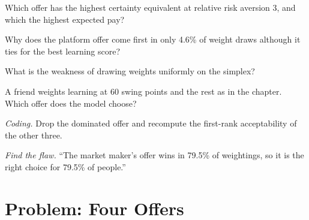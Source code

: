\begin{exercise}[$\star$]\label{exo:in:choosing:3}
Which offer has the highest certainty equivalent at relative risk aversion 3, and which the highest expected pay?
\end{exercise}

\begin{exercise}[$\star\star$]\label{exo:in:choosing:4}
Why does the platform offer come first in only 4.6\% of weight draws although it ties for the best learning score?
\end{exercise}

\begin{exercise}[$\star\star$]\label{exo:in:choosing:5}
What is the weakness of drawing weights uniformly on the simplex?
\end{exercise}

\begin{exercise}[$\star\star$]\label{exo:in:choosing:6}
A friend weights learning at 60 swing points and the rest as in the chapter. Which offer does the model choose?
\end{exercise}

\begin{exercise}[$\star\star\star$]\label{exo:in:choosing:7}
\emph{Coding.} Drop the dominated offer and recompute the first-rank acceptability of the other three.
\end{exercise}

\begin{exercise}[$\star\star\star$]\label{exo:in:choosing:8}
\emph{Find the flaw.} ``The market maker's offer wins in 79.5\% of weightings, so it is the right choice for 79.5\% of
people.''
\end{exercise}

\section{Problem: Four Offers}

